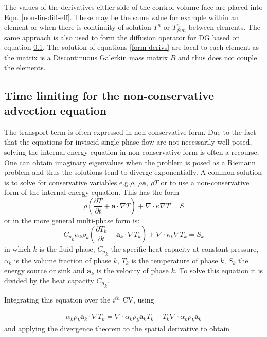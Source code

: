 The values of the derivatives either side of the control volume face are placed into Eqn. \ref{non-lin-diff-eff}. These may be the same value for example within an element or when there is continuity of solution $T^n$ or $T_{fem}^n$ between elements. The same approach is also used to form the diffusion operator for DG based on equation \ref{}.  The solution of equations \ref{form-derivs} are local to each element as 
the matrix is a Discontinuous Galerkin mass matrix $B$ and 
thus does not couple the elements. 




\subsection{Time limiting for the non-conservative advection equation}

The transport term is often expressed in non-conservative form. Due to the fact that the equations for inviscid single phase flow are not necessarily well posed, solving the internal energy equation in non-conservative form is often a recourse.  One can obtain imaginary eigenvalues when the problem is posed as a Riemann problem and thus the solutions tend to diverge exponentially. A common solution is to solve for conservative variables e.g.$\rho$, $\rho\mathbf{a}$, $\rho T$ or to use a non-conservative form of the internal energy equation. This has the form 
\begin{equation}
\rho \left( \frac{\partial T}{\partial t} + \mathbf{a}\cdot\nabla
T \right) + \nabla \cdot \kappa\nabla T  = S
\end{equation}
or in the more general multi-phase form is:
\begin{equation}
{C_p}_k \alpha_k \rho_k \left( \frac{\partial T_k}{\partial t} + \mathbf{a}_k\cdot\nabla
T_k \right) + \nabla \cdot \kappa_k \nabla T_k  = S_k
\label{multiT}
\end{equation}
in which $k$ is the fluid phase, ${C_p}_k$ the specific heat capacity at constant pressure, $\alpha_k$ is the volume fraction of phase $k$, $T_k$ is the temperature of phase $k$, $S_k$ the energy source or sink and $\mathbf{a}_k$ is the velocity of phase $k$. To solve this equation it is divided by the heat capacity ${C_p}_k$.

Integrating this equation over the $i^{th}$ CV, using

\begin{eqnarray}
\alpha_k \rho_k
\mathbf{a}_k \cdot \nabla T_k = \nabla \cdot \alpha_k\rho_k \mathbf{a}_k T_k - T_k\nabla\cdot \alpha_k \rho_k \mathbf{a}_k
\label{parts}
\end{eqnarray}
and applying the divergence theorem to the spatial derivative to obtain


